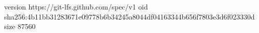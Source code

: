 version https://git-lfs.github.com/spec/v1
oid sha256:4b11bb31283671e09778b6b34245a8044df04163344b656f7803e3d6f023330d
size 87560
